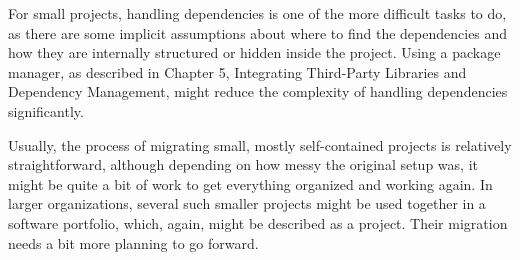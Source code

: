 For small projects, handling dependencies is one of the more difficult tasks to do, as there are some implicit assumptions about where to find the dependencies and how they are internally structured or hidden inside the project. Using a package manager, as described in Chapter 5, Integrating Third-Party Libraries and Dependency Management, might reduce the complexity of handling dependencies significantly.

Usually, the process of migrating small, mostly self-contained projects is relatively straightforward, although depending on how messy the original setup was, it might be quite a bit of work to get everything organized and working again. In larger organizations, several such smaller projects might be used together in a software portfolio, which, again, might be described as a project. Their migration needs a bit more planning to go forward.















































